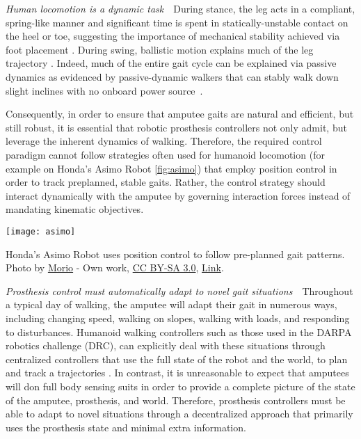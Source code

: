 \begin{challenges}
    \item\label{chal:dynamic} \emph{Human locomotion is a dynamic task}~~During
    stance, the leg acts in a compliant, spring-like manner
    \citep{geyer2006compliant} and significant time is spent in
    statically-unstable contact on the heel or toe, suggesting the importance of
    mechanical stability achieved via foot placement \citep{perry2010gait}.
    During swing, ballistic motion explains much of the leg trajectory
    \citep{mochon1980ballistic}. Indeed, much of the entire gait cycle can be
    explained via passive dynamics as evidenced by passive-dynamic walkers that
    can stably walk down slight inclines with no onboard power
    source~\citep{mcgeer1990passive, collins2005efficient}.

    Consequently, in order to ensure that amputee gaits are natural and
    efficient, but still robust, it is essential that robotic prosthesis
    controllers not only admit, but leverage the inherent dynamics of walking.
    Therefore, the required control paradigm cannot follow strategies often used
    for humanoid locomotion (for example on Honda's Asimo Robot
    \cref{fig:asimo}) that employ position control in order to track preplanned,
    stable gaits. Rather, the control strategy should interact dynamically with
    the amputee by governing interaction forces instead of mandating kinematic
    objectives.

    \begin{marginfigure}
        \centering
        \texttt{[image: asimo]}
        \caption{Honda's Asimo Robot uses position control to follow pre-planned
        gait patterns. Photo by
        \href{http://commons.wikimedia.org/wiki/User:Morio}{Morio} - Own work,
        \href{http://creativecommons.org/licenses/by-sa/3.0}{CC BY-SA 3.0},
        \href{https://commons.wikimedia.org/w/index.php?curid=29969316}{Link}.}
        \label{fig:asimo}
    \end{marginfigure}

    \item\label{chal:adaptability} \emph{Prosthesis control must automatically
    adapt to novel gait situations}~~Throughout a typical day of walking, the
    amputee will adapt their gait in numerous ways, including changing speed,
    walking on slopes, walking with loads, and responding to disturbances.
    Humanoid walking controllers such as those used in the DARPA robotics
    challenge (DRC), can explicitly deal with these situations through
    centralized controllers that use the full state of the robot and the world,
    to plan and track a trajectories \citep{feng2015optimization,
    kuindersma2014efficiently, englsberger2014trajectory}. In contrast, it is
    unreasonable to expect that amputees will don full body sensing suits in
    order to provide a complete picture of the state of the amputee, prosthesis,
    and world. Therefore, prosthesis controllers must be able to adapt to novel
    situations through a decentralized approach that primarily uses the
    prosthesis state and minimal extra information.


\end{challenges}
